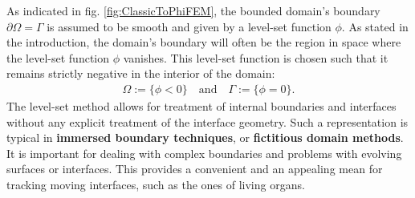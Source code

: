 As indicated in fig. \ref{fig:ClassicToPhiFEM}, the bounded domain's boundary $\partial\Omega = \Gamma$ is assumed to be smooth and given by a level-set function $\phi$. As stated in the introduction, the domain's boundary will often be the region in space where the level-set function $\phi$ vanishes. This level-set function is chosen such that it remains strictly negative in the interior of the domain:
\begin{align*}
    \Omega := \{ \phi <0 \} \quad \text{and} \quad \Gamma := \{ \phi =0 \}.
\end{align*}
The level-set method allows for treatment of internal boundaries and interfaces without any explicit treatment of the interface geometry. Such a representation is typical in \textbf{immersed boundary techniques}, or \textbf{fictitious domain methods}. It is important for dealing with complex boundaries and problems with evolving surfaces or interfaces. This provides a convenient and an appealing mean for tracking moving interfaces, such as the ones of living organs.

